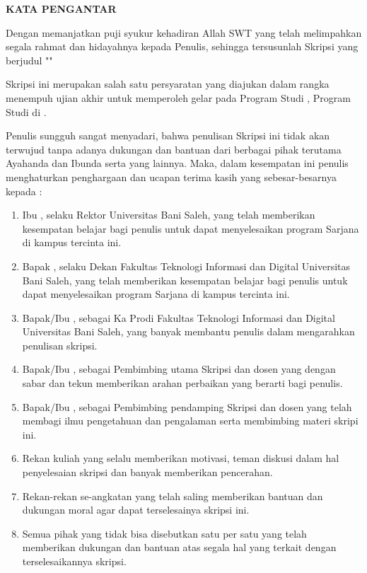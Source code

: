 
\clearpage
{}
{}
\begin{center}
    \textbf{\large KATA PENGANTAR}\\[3em]
\end{center}

Dengan memanjatkan puji syukur kehadiran Allah SWT yang telah melimpahkan segala rahmat dan hidayahnya kepada Penulis, sehingga tersusunlah Skripsi yang berjudul "\textbf{\judullaporanid}"

Skripsi ini merupakan salah satu persyaratan yang diajukan dalam rangka menempuh ujian akhir untuk memperoleh gelar {\gelar} {\gelarsingkat} pada Program Studi {\prodi}, Program Studi {\prodi} di {\fakultas} {\universitas}.

Penulis sungguh sangat menyadari, bahwa penulisan Skripsi ini tidak akan terwujud tanpa adanya dukungan dan bantuan dari berbagai pihak terutama Ayahanda dan Ibunda serta yang lainnya. Maka, dalam kesempatan ini penulis menghaturkan penghargaan dan ucapan terima kasih yang sebesar-besarnya kepada :

\begin{enumerate}[leftmargin=0.5cm]
    \item Ibu \textbf{\rektor}, selaku Rektor Universitas Bani Saleh, yang telah memberikan kesempatan belajar bagi penulis untuk dapat menyelesaikan program Sarjana di kampus tercinta ini.
    \item Bapak \textbf{\dekan}, selaku Dekan Fakultas Teknologi Informasi dan Digital Universitas Bani Saleh, yang telah memberikan kesempatan belajar bagi penulis untuk dapat menyelesaikan program Sarjana di kampus tercinta ini.
    \item Bapak/Ibu \textbf{\kaprodi}, sebagai Ka Prodi Fakultas Teknologi Informasi dan Digital Universitas Bani Saleh, yang banyak membantu penulis dalam mengarahkan penulisan skripsi.
    \item Bapak/Ibu \textbf{\pembimbingutama}, sebagai Pembimbing utama Skripsi dan dosen yang dengan sabar dan tekun memberikan arahan perbaikan yang berarti bagi penulis.
    \item Bapak/Ibu \textbf{\pembimbingpendamping}, sebagai Pembimbing pendamping Skripsi dan dosen yang telah membagi ilmu pengetahuan dan pengalaman serta membimbing materi skripi ini.
    \item Rekan kuliah yang selalu memberikan motivasi, teman diskusi dalam hal penyelesaian skripsi dan banyak memberikan pencerahan.
    \item Rekan-rekan se-angkatan yang telah saling memberikan bantuan dan dukungan moral agar dapat terselesainya skripsi ini.
    \item Semua pihak yang tidak bisa disebutkan satu per satu yang telah memberikan dukungan dan bantuan atas segala hal yang terkait dengan terselesaikannya skripsi.
\end{enumerate}

